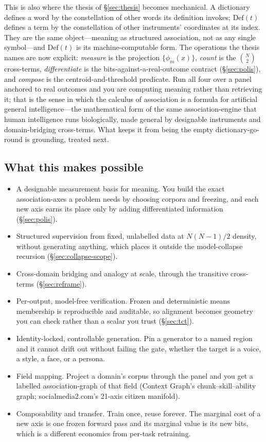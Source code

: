 \documentclass[10pt,twocolumn]{article}
\begin{document}
This is also where the thesis of \S\ref{sec:thesis} becomes mechanical. A
dictionary defines a word by the constellation of other words its definition
invokes; $\mathrm{Def}(t)$ defines a term by the constellation of other
instruments' coordinates at its index. They are the same object---meaning as
structured association, not as any single symbol---and $\mathrm{Def}(t)$ is its
machine-computable form. The operations the thesis names are now explicit:
\emph{measure} is the projection $\{\phi_m(x)\}$, \emph{count} is the
$\binom{N}{2}$ cross-terms, \emph{differentiate} is the bits-against-a-real-outcome
contract (\S\ref{sec:polis}), and \emph{compose} is the centroid-and-threshold
predicate. Run all four over a panel anchored to real outcomes and you are
computing meaning rather than retrieving it; that is the sense in which the
calculus of association is a formula for artificial general intelligence---the
mathematical form of the same association-engine that human intelligence runs
biologically, made general by designable instruments and domain-bridging
cross-terms. What keeps it from being the empty dictionary-go-round is grounding,
treated next.

\subsection{What this makes possible}
\begin{itemize}\itemsep0.12em
\item A designable measurement basis for meaning. You build the exact
association-axes a problem needs by choosing corpora and freezing, and each new
axis earns its place only by adding differentiated information
(\S\ref{sec:polis}).
\item Structured supervision from fixed, unlabelled data at $N(N-1)/2$ density,
without generating anything, which places it outside the model-collapse recursion
(\S\ref{sec:collapse-scope}).
\item Cross-domain bridging and analogy at scale, through the transitive
cross-terms (\S\ref{sec:reframe}).
\item Per-output, model-free verification. Frozen and deterministic means
membership is reproducible and auditable, so alignment becomes geometry you can
check rather than a scalar you trust (\S\ref{sec:tct}).
\item Identity-locked, controllable generation. Pin a generator to a named region
and it cannot drift out without failing the gate, whether the target is a voice,
a style, a face, or a persona.
\item Field mapping. Project a domain's corpus through the panel and you get a
labelled association-graph of that field (Context Graph's
chunk--skill--ability graph; socialmedia2.com's 21-axis citizen manifold).
\item Composability and transfer. Train once, reuse forever. The marginal cost of
a new axis is one frozen forward pass and its marginal value is its new bits,
which is a different economics from per-task retraining.
\end{itemize}
\end{document}
